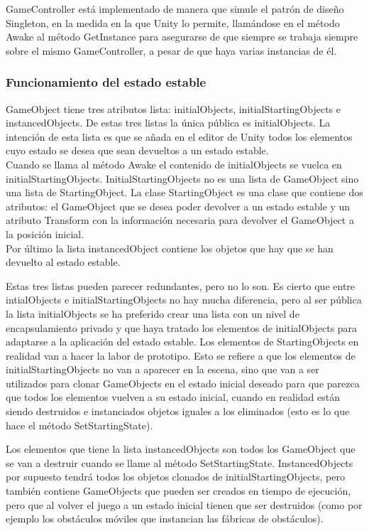 GameController está implementado de manera que simule el patrón de diseño Singleton, en la medida en la que Unity lo permite, llamándose en el método Awake al método GetInstance para asegurarse de que siempre se trabaja siempre sobre el mismo GameController, a pesar de que haya varias instancias de él.

\subsubsection{Funcionamiento del estado estable}
GameObject tiene tres atributos lista: initialObjects, initialStartingObjects e instancedObjects. De estas tres listas la única pública es initialObjects. La intención de esta lista es que se añada en el editor de Unity todos los elementos cuyo estado se desea que sean devueltos a un estado estable.\\
Cuando se llama al método Awake el contenido de initialObjects se vuelca en initialStartingObjects. InitialStartingObjects no es una lista de GameObject sino una lista de StartingObject. La clase StartingObject es una clase que contiene dos atributos: el GameObject que se desea poder devolver a un estado estable y un atributo Transform con la información necesaria para devolver el GameObject a la posición inicial.\\
Por último la lista instancedObject contiene los objetos que hay que se han devuelto al estado estable.

Estas tres listas pueden parecer redundantes, pero no lo son. Es cierto que entre intialObjects e initialStartingObjects no hay mucha diferencia, pero al ser pública la lista initialObjects se ha preferido crear una lista con un nivel de encapsulamiento privado y que haya tratado los elementos de initialObjects para adaptarse a la aplicación del estado estable. Los elementos de StartingObjects en realidad van a hacer la labor de prototipo. Esto se refiere a que los elementos de initialStartingObjects no van a aparecer en la escena, sino que van a ser utilizados para clonar GameObjects en el estado inicial deseado para que parezca que todos los elementos vuelven a su estado inicial, cuando en realidad están siendo destruidos e instanciados objetos iguales a los eliminados (esto es lo que hace el método SetStartingState).

Los elementos que tiene la lista instancedObjects son todos los GameObject que se van a destruir cuando se llame al método SetStartingState. InstancedObjects por supuesto tendrá todos los objetos clonados de initialStartingObjects, pero también contiene GameObjects que pueden ser creados en tiempo de ejecución, pero que al volver el juego a un estado inicial tienen que ser destruidos (como por ejemplo los obstáculos móviles que instancian las fábricas de obstáculos).

